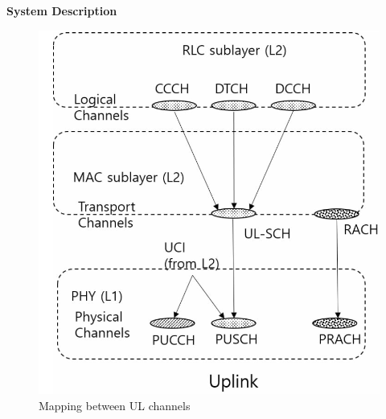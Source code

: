 \documentclass{beamer}
\begin{document}
\begin{frame}{\textbf{System Description}}
    \begin{figure}
        \centering
        \includegraphics[scale=0.3     
        ]{UPLINK.png}
        \caption{ Mapping between UL channels}
    \end{figure} 
\end{frame}
\end{document}
